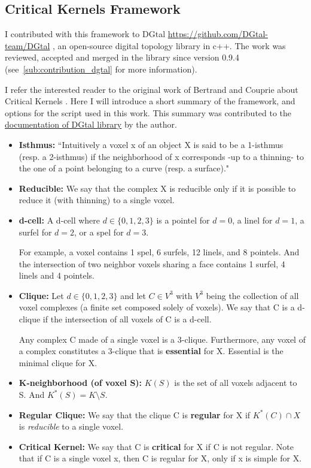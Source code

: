 \subsection{Critical Kernels Framework}%
\label{sub:critical_kernels_framework}

    I contributed with this framework to DGtal \url{https://github.com/DGtal-team/DGtal} \cite{david_coeurjolly_dgtal-team/dgtal:_2018}, an open-source digital topology
    library in c++.
    The work was reviewed, accepted and merged in the library since version 0.9.4 (see~\ref{sub:contribution_dgtal} for more information).

I refer the interested reader to the original work of Bertrand and Couprie about Critical Kernels \cite{bertrand_parallel_2017}. Here I will introduce a short summary of the framework, and options for the script used in this work. This summary was contributed to the \href{https://dgtal.org/doc/nightly/moduleVoxelComplex.html}{documentation of DGtal library} by the author.

\begin{itemize}[topsep=0pt]
  \item \textbf{Isthmus: } ``Intuitively a voxel x of an object X is said to be a 1-isthmus (resp. a 2-isthmus)
    if the neighborhood of x corresponds -up to a thinning- to the one of a point belonging to a curve (resp. a surface)."
  \item \textbf{Reducible: } We say that the complex X is reducible only if it is possible to reduce it (with thinning) to a single voxel.
  \item \textbf{d-cell: }
    A d-cell where $ d \in \{0,1,2,3\} $ is a pointel for $d = 0$, a linel for $d = 1$, a surfel for
    $d = 2$, or a spel for $d = 3$.

    For example, a voxel contains 1 spel, 6 surfels, 12 linels, and 8 pointels. And the intersection of two neighbor voxels sharing a face contains 1 surfel, 4 linels and 4 pointels.
  \item \textbf{Clique: }
    Let $ d \in \{0,1,2,3\} $ and let $ C \in V^3 $ with $V^3$ being the collection of all
    voxel complexes (a finite set composed solely of voxels).
    We say that C is a d-clique if the intersection of all voxels of C is a d-cell.

    Any complex C made of a single voxel is a 3-clique. Furthermore, any voxel of a complex
    constitutes a 3-clique that is \textbf{essential} for X. Essential is the minimal clique for X.
  \item \textbf{K-neighborhood (of voxel S): }
    $K(S)$ is the set of all voxels adjacent to S. And $K^*(S) = K \setminus  S$.
  \item \textbf{Regular Clique: }
    We say that the clique C is \textbf{regular} for X if $K^*(C) \cap X $ is \textit{reducible} to a
    single voxel.
  \item \textbf{Critical Kernel: }
    We say that C is \textbf{critical} for X if C is not regular.
    Note that if C is a single voxel x, then C is regular for X, only if x is simple for X.
\end{itemize}

